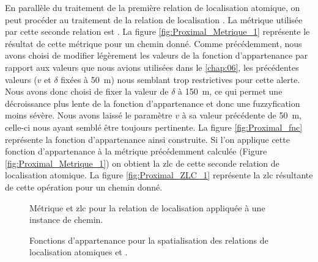 En parallèle du traitement de la première relation de localisation
atomique, on peut procéder au traitement de la relation de
localisation . La métrique utilisée par cette
seconde relation est . La figure
\ref{fig:Proximal_Metrique_1} représente le résultat de cette métrique
pour un chemin donné. Comme précédemment, nous avons choisi de
modifier légèrement les valeurs de la fonction d'appartenance par
rapport aux valeurs que nous avions utilisées dans le
\autoref{chap:06}, les précédentes valeurs (\(v\) et \(\delta\) fixées
à \SI{50}{\meter}) nous semblant trop restrictives pour cette
alerte. Nous avons donc choisi de fixer la valeur de \(\delta\) à
\SI{150}{\meter}, ce qui permet une décroissance plus lente de la
fonction d'appartenance et donc une fuzzyfication moins sévère. Nous
avons laissé le paramètre \(v\) à sa valeur précédente de
\SI{50}{\meter}, celle-ci nous ayant semblé être toujours
pertinente. La figure \ref{fig:Proximal_fnc} représente la fonction
d'appartenance ainsi construite. Si l'on applique cette fonction
d'appartenance à la métrique précédemment calculée (Figure
\ref{fig:Proximal_Metrique_1}) on obtient la \ac{zlc} de cette seconde
relation de localisation atomique. La figure \ref{fig:Proximal_ZLC_1}
représente la \ac{zlc} résultante de cette opération pour un chemin
donné.

\begin{figure}
  \centering
  
  \caption{Métrique \protect{} et
    \ac{zlc} \protect{} pour la relation de
    localisation \protect{} appliquée à une
    instance de chemin.}
  \label{fig:Proximal_1}
\end{figure}

\begin{figure}
  \centering
  \subfloat[\label{fig:SousAlt_fnc}]{%
    }\hspace{1cm}
  \subfloat[\label{fig:Proximal_fnc}]{%
}
  \caption{Fonctions d'appartenance pour la spatialisation des
relations de localisation atomiques
\protect{} \protect{}
et \protect{}
\protect{}.}
  \label{fig:SousProche_fnc}
\end{figure}

